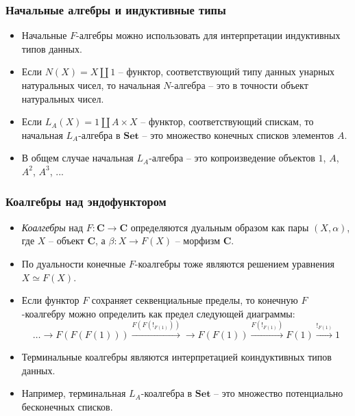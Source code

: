 \documentclass{beamer}
\theoremstyle{definition}
\newcommand{\cat}[1]{\mathbf{#1}}
\renewcommand{\C}{\cat{C}}
\newcommand{\Set}{\cat{Set}}
\begin{document}
\begin{frame}
\frametitle{Начальные алгебры и индуктивные типы}
\begin{itemize}
\item Начальные $F$-алгебры можно использовать для интерпретации индуктивных типов данных.
\item Если $N(X) = X \amalg 1$ -- функтор, соответствующий типу данных унарных натуральных чисел, то начальная $N$-алгебра -- это в точности объект натуральных чисел.
\item Если $L_A(X) = 1 \amalg A \times X$ -- функтор, соответствующий спискам, то начальная $L_A$-алгебра в $\Set$ -- это множество конечных списков элементов $A$.
\item В общем случае начальная $L_A$-алгебра -- это копроизведение объектов $1$, $A$, $A^2$, $A^3$, ...
\end{itemize}
\end{frame}

\begin{frame}
\frametitle{Коалгебры над эндофунктором}
\begin{itemize}
\item \emph{Коалгебры} над $F : \C \to \C$ определяются дуальным образом как пары $(X,\alpha)$, где $X$ -- объект $\C$, а $\beta : X \to F(X)$ -- морфизм $\C$.
\item По дуальности конечные $F$-коалгебры тоже являются решением уравнения $X \simeq F(X)$.
\item Если функтор $F$ сохраняет секвенциальные пределы, то конечную $F$-коалгебру можно определить как предел следующей диаграммы:
\[ \ldots \to F(F(F(1))) \xrightarrow{F(F(!_{F(1)}))} \to F(F(1)) \xrightarrow{F(!_{F(1)})} F(1) \xrightarrow{!_{F(1)}} 1 \]
\item Терминальные коалгебры являются интерпретацией коиндуктивных типов данных.
\item Например, терминальная $L_A$-коалгебра в $\Set$ -- это множество потенциально бесконечных списков.
\end{itemize}
\end{frame}
\end{document}
